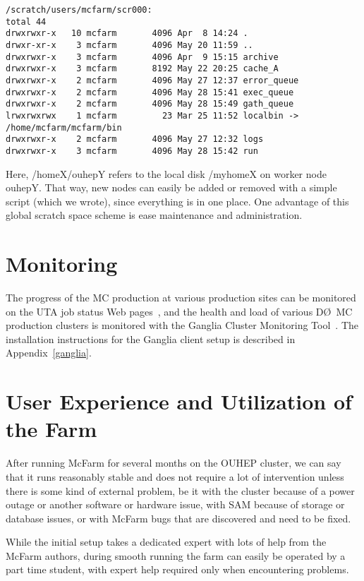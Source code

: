 \documentclass{revtex4}
\newcommand{\DO}{\mbox{D\O}}
\begin{document}
\begin{verbatim}
/scratch/users/mcfarm/scr000:
total 44
drwxrwxr-x   10 mcfarm       4096 Apr  8 14:24 .
drwxr-xr-x    3 mcfarm       4096 May 20 11:59 ..
drwxrwxr-x    3 mcfarm       4096 Apr  9 15:15 archive
drwxrwxr-x    3 mcfarm       8192 May 22 20:25 cache_A
drwxrwxr-x    2 mcfarm       4096 May 27 12:37 error_queue
drwxrwxr-x    2 mcfarm       4096 May 28 15:41 exec_queue
drwxrwxr-x    2 mcfarm       4096 May 28 15:49 gath_queue
lrwxrwxrwx    1 mcfarm         23 Mar 25 11:52 localbin -> /home/mcfarm/mcfarm/bin
drwxrwxr-x    2 mcfarm       4096 May 27 12:32 logs
drwxrwxr-x    3 mcfarm       4096 May 28 15:42 run
\end{verbatim}

Here, /homeX/ouhepY refers to the local disk /myhomeX on worker node ouhepY.
That way, new nodes can easily be added or removed with a simple script 
(which we wrote), since everything is in one place. 
One advantage of this global scratch space scheme 
is ease maintenance and administration.

\section{Monitoring}

The progress of the MC production at various production sites 
can be monitored on the UTA job status Web pages~\cite{jobstatmon}, 
and the health and load of various \DO\ MC production clusters 
is monitored with the Ganglia Cluster Monitoring Tool~\cite{gangliamon}. 
The installation instructions for the Ganglia client setup is described 
in Appendix~\ref{ganglia}.

\section{User Experience and Utilization of the Farm}

After running McFarm for several months on the OUHEP cluster, 
we can say that it runs reasonably stable and does not require 
a lot of intervention unless there is some kind of external problem, 
be it with the cluster because of a power outage or another 
software or hardware issue, with SAM because of storage or database 
issues, or with McFarm bugs that are discovered and need to be fixed.

While the initial setup takes a dedicated expert with lots of help 
from the McFarm authors, during smooth running the farm can easily 
be operated by a part time student, with expert help required only 
when encountering problems.
\end{document}
